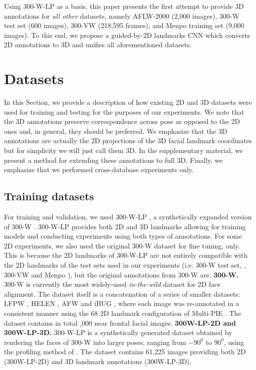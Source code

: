 	Using 300-W-LP \cite{zhu2016face} as a basis, this paper presents the first attempt to provide 3D annotations for \textit{all other} datasets, namely AFLW-2000 \cite{zhu2016face} (2,000 images), 300-W test set \cite{sagonas2016300} (600 images), 300-VW \cite{shen2015first} (218,595 frames), and Menpo training set (9,000 images). To this end, we propose a guided-by-2D landmarks CNN which converts 2D annotations to 3D and unifies all aforementioned datasets.

	\section{Datasets}

	In this Section, we provide a description of how existing 2D and 3D datasets were used for training and testing for the purposes of our experiments. We note that the 3D annotations preserve correspondence across pose as opposed to the 2D ones and, in general, they should be preferred. We emphasize that the 3D annotations are actually the 2D projections of the 3D facial landmark coordinates but for simplicity we will just call them 3D. In the supplementary material, we present a method for extending these annotations to full 3D. Finally, we emphasize that we performed cross-database experiments only. 

	\subsection{Training datasets} For training and validation, we used 300-W-LP \cite{zhu2016face}, a synthetically expanded version of 300-W \cite{sagonas2013300}. 300-W-LP provides both 2D and 3D landmarks allowing for training models and conducting experiments using both types of annotations. For some 2D experiments, we also used the original 300-W dataset \cite{sagonas2013300} for fine tuning, only. This is because the 2D landmarks of 300-W-LP are not entirely compatible with the 2D landmarks of the test sets used in our experiments (i.e. 300-W test set, \cite{sagonas2016300}, 300-VW \cite{shen2015first} and Menpo \cite{menpo}), but the original annotations from 300-W are. 
	 \textbf{300-W.} 300-W \cite{sagonas2013300} is currently the most widely-used \textit{in-the-wild} dataset for 2D face alignment. The dataset itself is a concatenation of a series of smaller datasets: LFPW \cite{belhumeur2013localizing}, HELEN \cite{le2012interactive}, AFW \cite{zhu2012face} and iBUG \cite{sagonas2013semi}, where each image was re-annotated in a consistent manner using the 68 2D landmark configuration of Multi-PIE \cite{gross2010multi}. The dataset contains in total ,000 near frontal facial images. 
	\textbf{300W-LP-2D and 300W-LP-3D.} 300-W-LP is a synthetically generated dataset obtained by rendering the faces of 300-W into larger poses, ranging from $-90^0$ to $90^0$, using the profiling method of \cite{zhu2016face}. The dataset contains 61,225 images providing both 2D (300W-LP-2D) and 3D landmark annotations (300W-LP-3D). 

